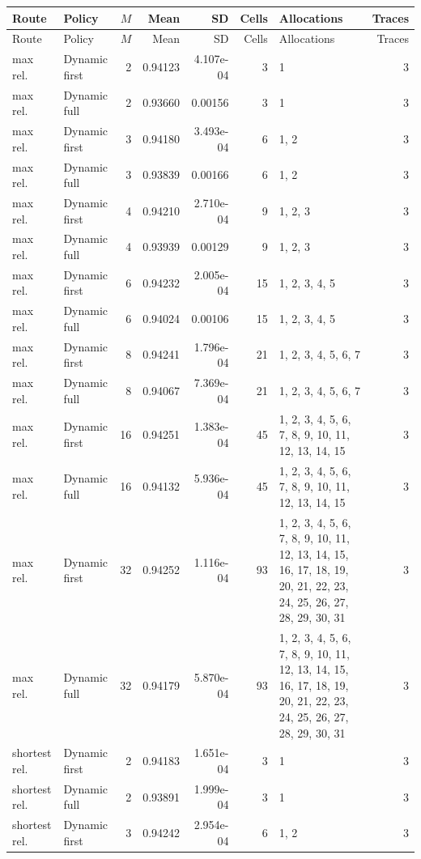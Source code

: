 \documentclass[10pt,a4paper]{article}
\begin{document}
\tiny\setlength{\tabcolsep}{2pt}\begin{longtable}{@{}p{23mm}p{29mm}rrrrp{36mm}r@{}}
\toprule Route & Policy & $M$ & Mean & SD & Cells & Allocations & Traces \\ \midrule\endfirsthead
\toprule Route & Policy & $M$ & Mean & SD & Cells & Allocations & Traces \\ \midrule\endhead
\bottomrule\endfoot
max rel. & Dynamic first & 2 & 0.94123 & 4.107e-04 & 3 & 1 & 3 \\
max rel. & Dynamic full & 2 & 0.93660 & 0.00156 & 3 & 1 & 3 \\
max rel. & Dynamic first & 3 & 0.94180 & 3.493e-04 & 6 & 1, 2 & 3 \\
max rel. & Dynamic full & 3 & 0.93839 & 0.00166 & 6 & 1, 2 & 3 \\
max rel. & Dynamic first & 4 & 0.94210 & 2.710e-04 & 9 & 1, 2, 3 & 3 \\
max rel. & Dynamic full & 4 & 0.93939 & 0.00129 & 9 & 1, 2, 3 & 3 \\
max rel. & Dynamic first & 6 & 0.94232 & 2.005e-04 & 15 & 1, 2, 3, 4, 5 & 3 \\
max rel. & Dynamic full & 6 & 0.94024 & 0.00106 & 15 & 1, 2, 3, 4, 5 & 3 \\
max rel. & Dynamic first & 8 & 0.94241 & 1.796e-04 & 21 & 1, 2, 3, 4, 5, 6, 7 & 3 \\
max rel. & Dynamic full & 8 & 0.94067 & 7.369e-04 & 21 & 1, 2, 3, 4, 5, 6, 7 & 3 \\
max rel. & Dynamic first & 16 & 0.94251 & 1.383e-04 & 45 & 1, 2, 3, 4, 5, 6, 7, 8, 9, 10, 11, 12, 13, 14, 15 & 3 \\
max rel. & Dynamic full & 16 & 0.94132 & 5.936e-04 & 45 & 1, 2, 3, 4, 5, 6, 7, 8, 9, 10, 11, 12, 13, 14, 15 & 3 \\
max rel. & Dynamic first & 32 & 0.94252 & 1.116e-04 & 93 & 1, 2, 3, 4, 5, 6, 7, 8, 9, 10, 11, 12, 13, 14, 15, 16, 17, 18, 19, 20, 21, 22, 23, 24, 25, 26, 27, 28, 29, 30, 31 & 3 \\
max rel. & Dynamic full & 32 & 0.94179 & 5.870e-04 & 93 & 1, 2, 3, 4, 5, 6, 7, 8, 9, 10, 11, 12, 13, 14, 15, 16, 17, 18, 19, 20, 21, 22, 23, 24, 25, 26, 27, 28, 29, 30, 31 & 3 \\
shortest rel. & Dynamic first & 2 & 0.94183 & 1.651e-04 & 3 & 1 & 3 \\
shortest rel. & Dynamic full & 2 & 0.93891 & 1.999e-04 & 3 & 1 & 3 \\
shortest rel. & Dynamic first & 3 & 0.94242 & 2.954e-04 & 6 & 1, 2 & 3 \\

\end{longtable}
\end{document}
